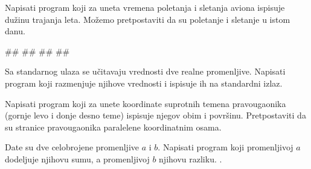 \begin{Exercise}[label=p1.1_11] 
Napisati program koji za uneta vremena poletanja i sletanja aviona  ispisuje dužinu trajanja leta. Možemo pretpostaviti da su poletanje i sletanje u istom danu.\\
\begin{miditest}
\begin{upotreba}{1}
#\naslovInt#
##
##
##
\end{upotreba}
\end{miditest}
\end{Exercise}
\begin{Answer}[ref=p1.1_11]
\end{Answer}


\begin{Exercise}[label=p1_12]
Sa standarnog ulaza se učitavaju vrednosti dve realne promenljive. Napisati program koji razmenjuje njihove vrednosti i ispisuje ih na standardni izlaz. \\
\end{Exercise}
\begin{Answer}[ref=p1_12]
\end{Answer}


\begin{Exercise}[label=p1_13] 
Napisati program koji za unete koordinate suprotnih temena pravougaonika
 (gornje levo i donje desno teme) ispisuje njegov obim i površinu. Pretpostaviti da su stranice pravougaonika
paralelene koordinatnim osama.
\\
\end{Exercise}
\begin{Answer}[ref=p1_13]
\end{Answer}


\begin{Exercise}[label=p1_14]
Date su dve celobrojene promenljive $a$ i $b$. Napisati program koji promenljivoj $a$ dodeljuje
njihovu sumu, a promenljivoj $b$ njihovu razliku. . 

\end{Exercise}
\begin{Answer}[ref=p1_14]
\end{Answer}

